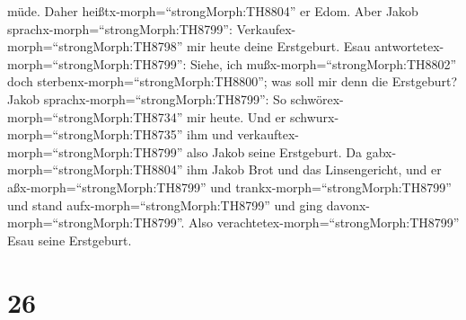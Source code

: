 müde. Daher heißtx-morph=``strongMorph:TH8804'' er Edom. 
Aber Jakob sprachx-morph=``strongMorph:TH8799'':
Verkaufex-morph=``strongMorph:TH8798'' mir heute deine Erstgeburt.
 Esau antwortetex-morph=``strongMorph:TH8799'': Siehe, ich
mußx-morph=``strongMorph:TH8802'' doch
sterbenx-morph=``strongMorph:TH8800''; was soll mir denn die Erstgeburt?
 Jakob sprachx-morph=``strongMorph:TH8799'': So
schwörex-morph=``strongMorph:TH8734'' mir heute. Und er
schwurx-morph=``strongMorph:TH8735'' ihm und
verkauftex-morph=``strongMorph:TH8799'' also Jakob seine Erstgeburt.
 Da gabx-morph=``strongMorph:TH8804'' ihm Jakob Brot und
das Linsengericht, und er aßx-morph=``strongMorph:TH8799'' und
trankx-morph=``strongMorph:TH8799'' und stand
aufx-morph=``strongMorph:TH8799'' und ging
davonx-morph=``strongMorph:TH8799''. Also
verachtetex-morph=``strongMorph:TH8799'' Esau seine Erstgeburt.

\hypertarget{section-25}{%
\section{26}\label{section-25}}

